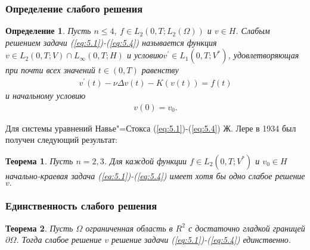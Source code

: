 \documentclass[10pt, pdf, hyperref={unicode}]{beamer}
\newtheorem{ru_theo}{Теорема}
\renewenvironment{theorem}{\begin{ru_theo}}{\end{ru_theo}}
\newtheorem{ru_def}{Определение}
\renewenvironment{definition}{\begin{ru_def}}{\end{ru_def}}
\begin{document}
    \begin{frame}
    \frametitle{Определение слабого решения}
    \begin{center}
      \begin{minipage}[h]{0.97\linewidth}
        \begin{definition}
    Пусть $n \le 4, \ f \in L_2(0, T; L_2(\Omega))$ и $v \in H$. Слабым решением задачи (\ref{eq:5.1})-(\ref{eq:5.4}) называется функция
    $v \in L_2(0, T; V)\cap L_{\infty}(0,T;H)$ и условию$ v^{\prime}\in L_1(0, T; V^\ast)$, удовлетворяющая при почти всех значений $t \in (0, T)$ равенству 
    \begin{equation}\label{eq:5.11}
        \begin{gathered}
            v^\prime(t) - \nu\Delta v(t) - K(v(t)) = f(t)
        \end{gathered}
    \end{equation}
      и начальному условию
    \begin{equation}\label{eq:5.12}
        \begin{gathered}
            v(0) = v_0.
        \end{gathered}
    \end{equation}
\end{definition}
Для системы уравнений Навье"=Стокса (\ref{eq:5.1})-(\ref{eq:5.4}) Ж. Лере в 1934 был получен следующий результат:
\begin{theorem}
Пусть $n=2,3$. Для каждой функции $f\in L_2(0,T;V^\ast)$ и $v_0\in H$ начально-краевая задача (\ref{eq:5.1})-(\ref{eq:5.4})
имеет хотя бы одно слабое решение $v.$
\end{theorem}
      \end{minipage}
    \end{center}
  \end{frame}

    \begin{frame}
    \frametitle{Единственность слабого решения}
    \begin{center}
      \begin{minipage}[h]{0.97\linewidth}
        \begin{theorem}
          Пусть $\Omega$ ограниченная область в $R^2$ с достаточно гладкой границей $\partial\Omega$. Тогда слабое решение $v$  решение
          задачи (\ref{eq:5.1})-(\ref{eq:5.4}) единственно.
        \end{theorem}
      \end{minipage}
    \end{center}
  \end{frame}
\end{document}
